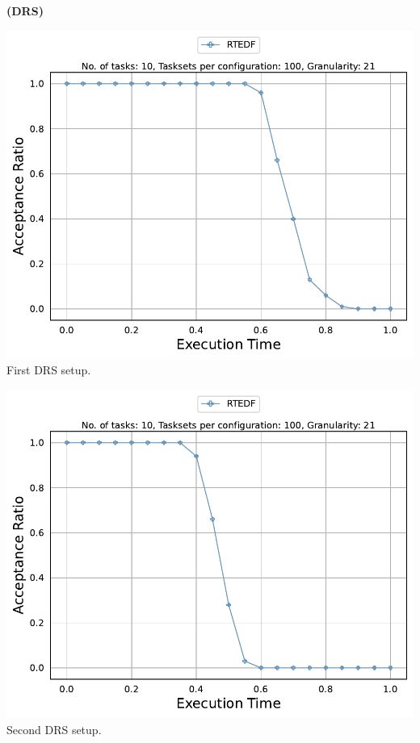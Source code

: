\documentclass[]{article}
\begin{document}
	\begin{minipage}[t]{0.48\linewidth}
		\centering
		\textbf{(DRS)}
		\vspace{0.3cm}
		
		\includegraphics[width=\linewidth]{RTEDF_1stSetup_DRS.pdf}
		First DRS setup.
		\vspace{0.3cm}
		
		\includegraphics[width=\linewidth]{RTEDF_2ndSetup_DRS.pdf}
		Second DRS setup.
		\vspace{0.3cm}
		

\end{minipage}
\end{document}
